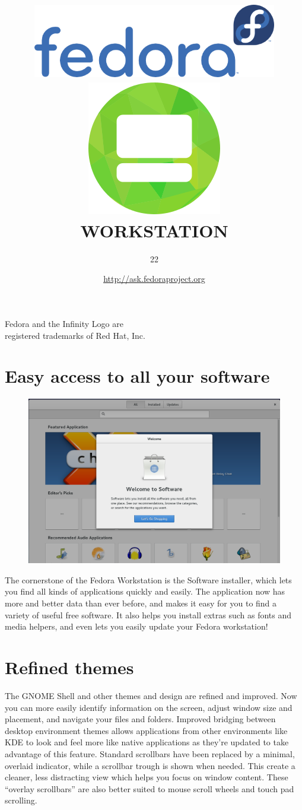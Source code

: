 \documentclass[
letterpaper,
10pt
]{leaflet}
\title{\includegraphics[keepaspectratio,width=0.8\textwidth]{Logo_fedoralogo.png}\vspace{1cm}\\\includegraphics[keepaspectratio,scale=0.5]{logo-color-workstation.png}\\\vspace{0.5cm}\LARGE{\textcolor{ResolutionBlue}{WORKSTATION}}}
\author{\LARGE{\textcolor{ResolutionBlue}{22}}}
\date{\href{http://ask.fedoraproject.org}{http://ask.fedoraproject.org}}
\begin{document}
\maketitle
\thispagestyle{empty}
\vspace{5cm}
\begin{center}\small{Fedora and the Infinity Logo are\\registered trademarks of Red Hat, Inc.}\end{center}

\newpage


\section{\textcolor{FedoraBlue}{Easy access to all your software}}
\begin{figure}[h]
  \includegraphics[keepaspectratio,width=\textwidth]{Gnome_software_welcome-cropped.png}
\end{figure}
The cornerstone of the Fedora Workstation is the Software installer, which lets you find all kinds of applications quickly and easily. The application now has more and better data than ever before, and makes it easy for you to find a variety of useful free software. It also helps you install extras such as fonts and media helpers, and even lets you easily update your Fedora workstation!

\section{\textcolor{FedoraBlue}{Refined themes}}
The GNOME Shell and other themes and design are refined and improved. Now you can more easily identify information on the screen, adjust window size and placement, and navigate your files and folders. Improved bridging between desktop environment themes allows applications from other environments like KDE to look and feel more like native applications as they're updated to take advantage of this feature. Standard scrollbars have been replaced by a minimal, overlaid indicator, while a scrollbar trough is shown when needed. This create a cleaner, less distracting view which helps you focus on window content. These ``overlay scrollbars'' are also better suited to mouse scroll wheels and touch pad scrolling.
\end{document}
